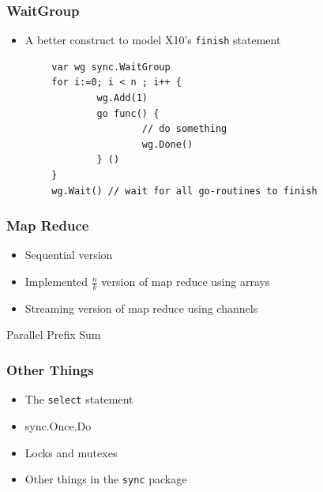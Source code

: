 \documentclass{beamer}
\begin{document}
\begin{frame} [fragile]
\frametitle{WaitGroup}
\begin{itemize}
\item A better construct to model X10's \verb=finish= statement
\end{itemize}
\begin{verbatim}
        var wg sync.WaitGroup
        for i:=0; i < n ; i++ {
                wg.Add(1)
                go func() { 
                        // do something
                        wg.Done()
                } ()                
        }
        wg.Wait() // wait for all go-routines to finish
\end{verbatim}


\end{frame}

\begin{frame}[fragile] 
\frametitle{Map Reduce}
\begin{itemize}
  \item Sequential version
  \item Implemented $\frac{n}{k}$ version of map reduce using arrays
  \item Streaming version of map reduce using channels
\end{itemize}
\end{frame}

\begin{frame} {Parallel Prefix Sum}
\end{frame}

\begin{frame} [fragile]
\frametitle{Other Things}
\begin{itemize}
\item The \verb=select= statement
\item sync.Once.Do
\item Locks and mutexes
\item Other things in the \verb=sync= package
\end{itemize}
\end{frame}
\end{document}
